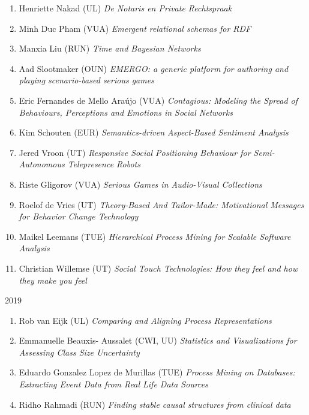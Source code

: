 \begin{multicols}{2}
\begin{scriptsize}
\begin{enumerate}[leftmargin=*,noitemsep,topsep=0pt,parsep=1pt,partopsep=0pt]
{}\item Henriette Nakad (UL) \textit{De Notaris en Private Rechtspraak 
}\item Minh Duc Pham (VUA) \textit{Emergent relational schemas for RDF 
}\item Manxia Liu (RUN) \textit{Time and Bayesian Networks 
}\item Aad Slootmaker (OUN) \textit{EMERGO: a generic platform for authoring and playing scenario-based serious games
}\item Eric Fernandes de Mello Araújo (VUA) \textit{Contagious: Modeling the Spread of Behaviours, Perceptions and Emotions in Social Networks
}\item Kim Schouten (EUR) \textit{Semantics-driven Aspect-Based Sentiment Analysis
}\item Jered Vroon (UT) \textit{Responsive Social Positioning Behaviour for Semi-Autonomous Telepresence Robots
}\item Riste Gligorov (VUA) \textit{Serious Games in Audio-Visual Collections
}\item Roelof de Vries (UT) \textit{Theory-Based And Tailor-Made: Motivational Messages for Behavior Change Technology 
}\item Maikel Leemans (TUE) \textit{Hierarchical Process Mining for Scalable Software Analysis}
\item Christian Willemse (UT) \textit{Social Touch Technologies: How they feel and how they make you feel}
\end{enumerate}	


\vspace{0.2cm}
2019
\vspace{0.2cm}
\begin{enumerate}[leftmargin=*,noitemsep,topsep=0pt,parsep=1pt,partopsep=0pt]
\renewcommand{\labelenumi}{2019-\arabic{enumi}}
\item Rob van Eijk (UL)	\textit{Comparing and Aligning Process Representations}
\item Emmanuelle Beauxis- Aussalet (CWI, UU) \textit{Statistics and Visualizations for Assessing Class Size Uncertainty}
\item Eduardo Gonzalez Lopez de Murillas (TUE) \textit{Process Mining on Databases: Extracting Event Data from Real Life Data Sources}
\item Ridho Rahmadi (RUN) \textit{Finding stable causal structures from clinical data}
\end{enumerate}


\end{scriptsize}
\end{multicols}
\restoregeometry
